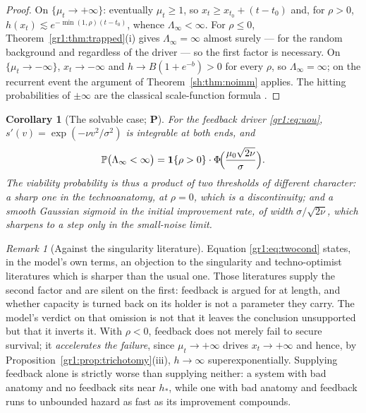 \documentclass[11pt]{article}
\numberwithin{equation}{section}
\theoremstyle{plain}
\newtheorem{corollary}[theorem]{Corollary}
\theoremstyle{definition}
\theoremstyle{remark}
\newtheorem{remark}[theorem]{Remark}
\newcommand{\PP}{\mathbb{P}}
\newcommand{\one}{\mathbf{1}}
\begin{document}
\begin{proof}
On $\{\mu_t\to+\infty\}$: eventually $\mu_t\ge1$, so $x_t\ge x_{t_0}+
(t-t_0)$ and, for $\rho>0$, $h(x_t)\lesssim e^{-\min(1,\rho)(t-t_0)}$,
whence $\Lambda_\infty<\infty$. For $\rho\le0$,
Theorem~\ref{gr1:thm:trapped}(i) gives $\Lambda_\infty=\infty$ almost
surely --- for the random background and regardless of the driver --- so
the first factor is necessary. On
$\{\mu_t\to-\infty\}$, $x_t\to-\infty$ and $h\to B(1+e^{-b})>0$ for
every $\rho$, so $\Lambda_\infty=\infty$; on the recurrent event the
argument of Theorem~\ref{sh:thm:noimm} applies. The hitting
probabilities of $\pm\infty$ are the classical scale-function formula
\cite{KT81,RY99}.
\end{proof}

\begin{corollary}[The solvable case; \textbf{P}]\label{gr1:cor:solvable}
For the feedback driver \eqref{gr1:eq:uou},
$s'(v)=\exp(-\nu v^{2}/\sigma^{2})$ is integrable at both ends, and
\begin{equation}\label{gr1:eq:sigmoid}
\PP\bigl(\Lambda_\infty<\infty\bigr)
=\one\{\rho>0\}\cdot\Phi\!\Bigl(\frac{\mu_0\sqrt{2\nu}}{\sigma}\Bigr).
\end{equation}
The viability probability is thus a \emph{product of two thresholds of
different character}: a sharp one in the technoanatomy, at $\rho=0$,
which is a discontinuity; and a smooth Gaussian sigmoid in the initial
improvement rate, of width $\sigma/\sqrt{2\nu}$, which sharpens to a
step only in the small-noise limit.
\end{corollary}

\begin{remark}[Against the singularity literature]
\label{gr1:rem:againstsing}
Equation \eqref{gr1:eq:twocond} states, in the model's own terms, an
objection to the singularity and techno-optimist literatures which is
sharper than the usual one. Those literatures supply
the second factor and are silent on the first: feedback is argued for at
length, and whether capacity is turned back on its holder is not a
parameter they carry. The model's verdict on that omission is not that
it leaves the conclusion unsupported but that it inverts it. With
$\rho<0$, feedback does not merely fail to secure survival; it
\emph{accelerates the failure}, since $\mu_t\to+\infty$ drives
$x_t\to+\infty$ and hence, by
Proposition~\ref{gr1:prop:trichotomy}(iii), $h\to\infty$
superexponentially. Supplying feedback alone is strictly worse than
supplying neither: a system with bad anatomy and no feedback sits near
$h_\ast$, while one with bad anatomy and feedback runs to unbounded
hazard as fast as its improvement compounds.
\end{remark}
\end{document}
